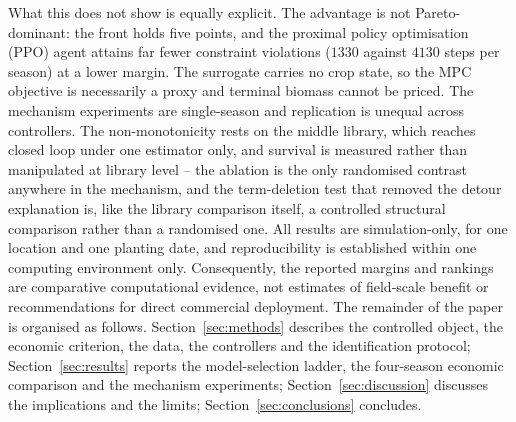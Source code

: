 What this does not show is equally explicit. The advantage is not Pareto-dominant: the
front holds five points, and the proximal policy optimisation (PPO) agent attains far
fewer constraint violations
($1330$ against $4130$ steps per season) at a lower margin. The surrogate carries no crop
state, so the MPC objective is necessarily a proxy and terminal biomass cannot be priced.
The mechanism experiments are single-season and replication is unequal across controllers.
The non-monotonicity rests on the middle library, which reaches closed loop under one
estimator only, and survival is measured rather than manipulated at library level -- the
ablation is the only randomised contrast anywhere in the mechanism, and the term-deletion
test that removed the detour explanation is, like the library comparison itself, a
controlled structural comparison rather than a randomised one.
All results are simulation-only, for one location and one planting date, and
reproducibility is established within one computing environment only. Consequently, the
reported margins and rankings are comparative computational evidence, not estimates of
field-scale benefit or recommendations for direct commercial deployment.
The remainder of
the paper is organised as follows. Section~\ref{sec:methods} describes the controlled
object, the economic criterion, the data, the controllers and the identification
protocol; Section~\ref{sec:results} reports the model-selection ladder, the four-season
economic comparison and the mechanism experiments; Section~\ref{sec:discussion} discusses
the implications and the limits; Section~\ref{sec:conclusions} concludes.


